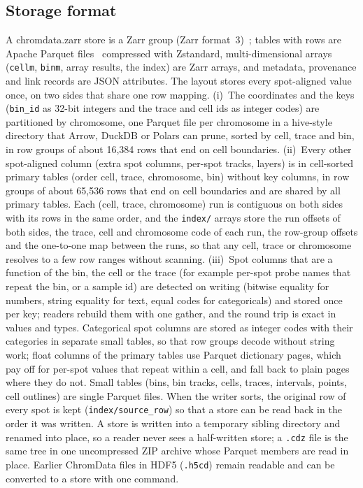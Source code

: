 \documentclass[11pt]{article}
\newcommand{\pkg}[1]{\texttt{#1}}
\begin{document}
\subsection*{Storage format}
A chromdata.zarr store is a Zarr group (Zarr format~3)~\citep{zarr}; tables with rows are Apache Parquet files~\citep{parquet,arrow} compressed with Zstandard, multi-dimensional arrays (\pkg{cellm}, \pkg{binm}, array results, the index) are Zarr arrays, and metadata, provenance and link records are JSON attributes.
The layout stores every spot-aligned value once, on two sides that share one row mapping.
(i)~The coordinates and the keys (\pkg{bin\_id} as 32-bit integers and the trace and cell ids as integer codes) are partitioned by chromosome, one Parquet file per chromosome in a hive-style directory that Arrow, DuckDB or Polars can prune, sorted by cell, trace and bin, in row groups of about 16,384 rows that end on cell boundaries.
(ii)~Every other spot-aligned column (extra spot columns, per-spot tracks, layers) is in cell-sorted primary tables (order cell, trace, chromosome, bin) without key columns, in row groups of about 65,536 rows that end on cell boundaries and are shared by all primary tables.
Each (cell, trace, chromosome) run is contiguous on both sides with its rows in the same order, and the \pkg{index/} arrays store the run offsets of both sides, the trace, cell and chromosome code of each run, the row-group offsets and the one-to-one map between the runs, so that any cell, trace or chromosome resolves to a few row ranges without scanning.
(iii)~Spot columns that are a function of the bin, the cell or the trace (for example per-spot probe names that repeat the bin, or a sample id) are detected on writing (bitwise equality for numbers, string equality for text, equal codes for categoricals) and stored once per key; readers rebuild them with one gather, and the round trip is exact in values and types.
Categorical spot columns are stored as integer codes with their categories in separate small tables, so that row groups decode without string work; float columns of the primary tables use Parquet dictionary pages, which pay off for per-spot values that repeat within a cell, and fall back to plain pages where they do not.
Small tables (bins, bin tracks, cells, traces, intervals, points, cell outlines) are single Parquet files.
When the writer sorts, the original row of every spot is kept (\pkg{index/source\_row}) so that a store can be read back in the order it was written.
A store is written into a temporary sibling directory and renamed into place, so a reader never sees a half-written store; a \pkg{.cdz} file is the same tree in one uncompressed ZIP archive whose Parquet members are read in place.
Earlier ChromData files in HDF5 (\pkg{.h5cd}) remain readable and can be converted to a store with one command.
\end{document}
